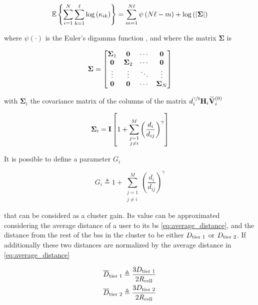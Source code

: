\begin{equation} \label{eq:sum_log_kappa}
    \mathbb{E}\left\{\sum_{i=1}^{N}\sum_{k=1}^{\ell}\log\left(\kappa_{ik}
    \right)\right\} = \sum_{m = 1}^{N\ell} \psi\left(N\ell - m\right) +
    \log\left(\left|\mathbf{\Sigma}\right|\right)
\end{equation}

\noindent
where $\psi\left(\cdot\right)$ is the Euler's digamma function
\cite{gradshteyn00}, and where the matrix $\mathbf{\Sigma}$ is

\begin{equation} \label{eq:covariance_total}
    \mathbf{\Sigma} = \begin{bmatrix}
        \mathbf{\Sigma}_1 & \mathbf{0} & \cdots & \mathbf{0} \\
        \mathbf{0} & \mathbf{\Sigma}_2 & \cdots & \mathbf{0} \\
        \vdots & \vdots & \ddots & \vdots \\
        \mathbf{0} & \mathbf{0} & \cdots & \mathbf{\Sigma}_N
    \end{bmatrix}
\end{equation}

\noindent
with $\mathbf{\Sigma}_i$ the covariance matrix of the columns of the matrix
$d_{i}^{\sfrac{\gamma}{2}} \mathbf{H}_i \mathbf{\widetilde{V}}_i^{(0)}$

\begin{equation} \label{eq:covariance_not_eye}
    \mathbf{\Sigma}_i = \mathbf{I} \left[1 + \sum\limits_{\substack{j=1\\j\neq i}}^{M}
        \left(\frac{d_{i}}{d_{ij}}\right)^{\gamma}
    \right]
\end{equation}

It is possible to define a parameter $G_i$

\begin{equation} \label{eq:cluster_gain}
    G_i \triangleq 1 + \sum\limits_{\substack{j=1\\j\neq i}}^{M} \left(
    \frac{d_{i}}{d_{ij}}\right)^{\gamma}
\end{equation}

\noindent
that can be considerd as a cluster gain. Its value can be approximated
considering the average distance of a user to its \gls{bs} 
\eqref{eq:average_distance}, and the distance from the rest of the \glspl{bs} in
the cluster to be either $D_{\text{tier 1}}$ or $D_{\text{tier 2}}$. If additionally these two
distances are normalized by the average distance in \eqref{eq:average_distance}

\begin{equation} \label{eq:normalized_distances}
\begin{aligned}
    \overline{D}_{\text{tier 1}} &\triangleq \frac{3D_{\text{tier 1}}}{2R_{\text{cell}}} \\
    \overline{D}_{\text{tier 2}} &\triangleq \frac{3D_{\text{tier 2}}}{2R_{\text{cell}}}
\end{aligned}
\end{equation}

